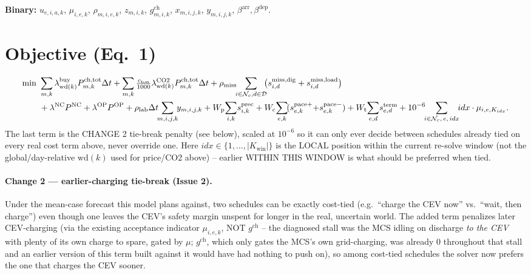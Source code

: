 \documentclass[11pt]{article}
\newcommand{\dt}{\Delta t}
\begin{document}
\smallskip
\textbf{Binary:} $u_{e,i,a,k}$, $\mu_{i,e,k}$, $\rho_{m,i,e,k}$, $z_{m,i,k}$,
$g^{\text{ch}}_{m,i,k}$, $x_{m,i,j,k}$, $y_{m,i,j,k}$, $\beta^{\text{arr}},\beta^{\text{dep}}$.

\section{Objective (Eq.\ 1)}
\begin{align}
\min\ &\sum_{m,k}\lambda^{\text{buy}}_{\mathrm{wd}(k)}P^{\text{ch,tot}}_{m,k}\dt
      +\sum_{m,k}\tfrac{c_{\text{ton}}}{1000}\lambda^{\text{CO2}}_{\mathrm{wd}(k)}P^{\text{ch,tot}}_{m,k}\dt
      +\rho_{\text{miss}}\!\!\sum_{i\in\mathcal{N}_c,d\in\mathcal{D}}\!\!\bigl(s^{\text{miss,dig}}_{i,d}+s^{\text{miss,load}}_{i,d}\bigr)\notag\\
     &+\lambda^{\text{NC}}P^{\text{NC}}+\lambda^{\text{OP}}P^{\text{OP}}
      +\rho_{\text{lab}}\dt\!\!\sum_{m,i,j,k}\!\! y_{m,i,j,k}
      + W_{\text{p}}\!\sum_{i,k}\! s^{\text{prec}}_{i,k}
      + W_{\text{c}}\!\sum_{e,k}\!(s^{\text{pace}+}_{e,k}{+}s^{\text{pace}-}_{e,k})
      + W_{\text{t}}\!\sum_{e,d}\! s^{\text{term}}_{e,d}
      +10^{-6}\!\!\sum_{i\in\mathcal{N}_c,\,e,\,idx}\!\! idx\cdot \mu_{i,e,K_{idx}}.
\end{align}
The last term is the CHANGE 2 tie-break penalty (see below), scaled at $10^{-6}$ so it can only
ever decide between schedules already tied on every real cost term above, never override one.
Here $idx\in\{1,\dots,|K_{\text{win}}|\}$ is the LOCAL position within the current re-solve window
(not the global/day-relative $\mathrm{wd}(k)$ used for price/CO2 above) -- earlier WITHIN THIS
WINDOW is what should be preferred when tied.

\paragraph{Change 2 --- earlier-charging tie-break (Issue 2).} Under the mean-case forecast this
model plans against, two schedules can be exactly cost-tied (e.g.\ ``charge the CEV now'' vs.\
``wait, then charge'') even though one leaves the CEV's safety margin unspent for longer in the
real, uncertain world. The added term penalizes later CEV-charging (via the existing acceptance
indicator $\mu_{i,e,k}$, NOT $g^{\text{ch}}$ -- the diagnosed stall was the MCS idling on discharge
\emph{to the CEV} with plenty of its own charge to spare, gated by $\mu$; $g^{\text{ch}}$, which
only gates the MCS's own grid-charging, was already 0 throughout that stall and an earlier version
of this term built against it would have had nothing to push on), so among cost-tied schedules the
solver now prefers the one that charges the CEV sooner.
\end{document}
